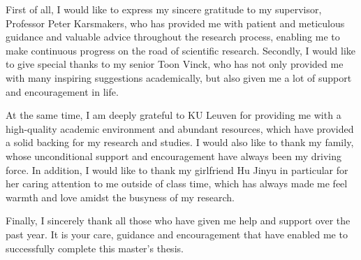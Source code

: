First of all, I would like to express my sincere gratitude to my supervisor, Professor Peter Karsmakers, who has provided me with patient and meticulous guidance and valuable advice throughout the research process, enabling me to make continuous progress on the road of scientific research. Secondly, I would like to give special thanks to my senior Toon Vinck, who has not only provided me with many inspiring suggestions academically, but also given me a lot of support and encouragement in life.

At the same time, I am deeply grateful to KU Leuven for providing me with a high-quality academic environment and abundant resources, which have provided a solid backing for my research and studies. I would also like to thank my family, whose unconditional support and encouragement have always been my driving force. In addition, I would like to thank my girlfriend Hu Jinyu in particular for her caring attention to me outside of class time, which has always made me feel warmth and love amidst the busyness of my research.

Finally, I sincerely thank all those who have given me help and support over the past year. It is your care, guidance and encouragement that have enabled me to successfully complete this master's thesis.